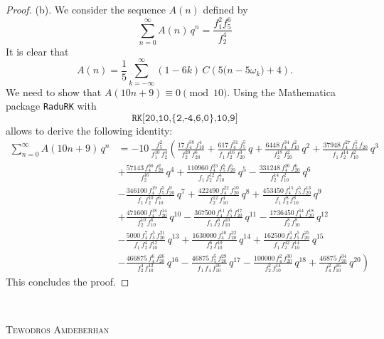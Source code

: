 \documentclass{article}
\begin{document}
\begin{proof}
	(b). We consider the sequence $A(n)$ defined by
	$$
	\sum_{n=0}^\infty A(n)\,q^n = \frac{f_1^2 f_{5}^6}{f_2^4}
	$$
	It is clear that
	$$
	A(n)=\frac{1}{5} \sum_{k=-\infty}^\infty (1-6k)\, C\left(5\Big(n-5\omega_k\Big)+4\right).
	$$
	We need to show that
	$A(10n+9)\equiv 0 \pmod {10}.$
	Using the Mathematica package \texttt{RaduRK} with
	$$\texttt{RK[20,10,\{2,-4,6,0\},10,9]}$$
	allows to derive the following identity:
	\begin{align*}
	\sum_{n=0}^\infty A(10n+9)\,q^n
	&=-10\,\frac{f_5^2}{f_1^{10}\,f_2^4} \left( \frac{17\,f_4^{38}\,f_{10}^4}{f_2^{20}\,f_{20}^6} 
	+\frac{617\,f_4^{31}\,f_5^5}{f_1\,f_2^{16}\,f_{20}^3}\,q 
	+\frac{6448\,f_4^{34}\,f_{10}^2}{\,f_2^{18}\,f_{20}^2}\,q^2
	+\frac{37948\,f_4^{27}\,f_5^5\,f_{20}}{f_1\,f_2^{14}\,f_{10}^2}\,q^3
	\right.\\
	& 
	+\frac{57143\,f_4^{30}\,f_{20}^2}
	{f_2^{16}}\,q^4
	+\frac{110960\,f_4^{23}\,f_5^5\,f_{20}^5}
	{f_1\,f_2^{12}\,f_{10}^4}\,q^5
	-\frac{331248\,f_4^{26}\,f_{20}^6}
	{f_2^{14}\,f_{10}^2}\,q^6 \\
    & 	-\frac{346100\,f_4^{19}\,f_5^5\,f_{20}^9}
    {f_1\,f_2^{10}\,f_{10}^6}\,q^7
    +\frac{422490\,f_4^{22}\,f_{20}^{10}}
    {f_2^{12}\,f_{10}^4}\,q^8
    +\frac{453450\,f_4^{15}\,f_5^5\,f_{20}^{13}}
    {f_1\,f_2^{8}\,f_{10}^8}\,q^9 \\
    &
    +\frac{471600\,f_4^{18}\,f_{20}^{14}}
    {f_2^{10}\,f_{10}^6}\,q^{10}
    -\frac{367500\,f_4^{11}\,f_5^5\,f_{20}^{17}}
    {f_1\,f_2^{6}\,f_{10}^{10}}\,q^{11}
	-\frac{1736450\,f_4^{14}\,f_{20}^{18}}
	{f_2^{8}\,f_{10}^8}\,q^{12} \\
	&
	-\frac{5000\,f_4^{7}\,f_5^5\,f_{20}^{21}}
	{f_1\,f_2^{4}\,f_{10}^{12}}\,q^{13}
	+\frac{1630000\,f_4^{10}\,f_{20}^{22}}
	{f_2^{6}\,f_{10}^{10}}\,q^{14}
	+\frac{162500\,f_4^{3}\,f_5^5\,f_{20}^{25}}
	{f_1\,f_2^{42}\,f_{10}^{14}}\,q^{15}\\
	&\left.
	-\frac{466875\,f_4^{6}\,f_{20}^{26}}
	{f_2^{4}\,f_{10}^{12}}\,q^{16}
	-\frac{46875\,f_5^5\,f_{20}^{29}}
	{f_1\,f_4\,f_{10}^{16}}\,q^{17}
	-\frac{100000\,f_4^{2}\,f_{20}^{30}}
	{f_2^{2}\,f_{10}^{14}}\,q^{18}
	+\frac{46875\,f_{20}^{34}}
	{f_4^{2}\,f_{10}^{16}}\,q^{20}
		\right)
	\end{align*}
	This concludes the proof.
\end{proof}





 \ 

{\textsc{Tewodros Amdeberhan}} 
\end{document}
